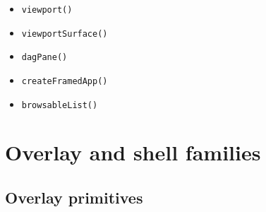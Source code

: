 \begin{itemize}
  \begin{itemize}
  \tightlist
  \item
    \texttt{v\allowbreak{}i\allowbreak{}e\allowbreak{}w\allowbreak{}p\allowbreak{}o\allowbreak{}r\allowbreak{}t\allowbreak{}(\allowbreak{})}
  \item
    \texttt{v\allowbreak{}i\allowbreak{}e\allowbreak{}w\allowbreak{}p\allowbreak{}o\allowbreak{}r\allowbreak{}t\allowbreak{}S\allowbreak{}u\allowbreak{}r\allowbreak{}f\allowbreak{}a\allowbreak{}c\allowbreak{}e\allowbreak{}(\allowbreak{})}
  \item
    \texttt{d\allowbreak{}a\allowbreak{}g\allowbreak{}P\allowbreak{}a\allowbreak{}n\allowbreak{}e\allowbreak{}(\allowbreak{})}
  \item
    \texttt{c\allowbreak{}r\allowbreak{}e\allowbreak{}a\allowbreak{}t\allowbreak{}e\allowbreak{}F\allowbreak{}r\allowbreak{}a\allowbreak{}m\allowbreak{}e\allowbreak{}d\allowbreak{}A\allowbreak{}p\allowbreak{}p\allowbreak{}(\allowbreak{})}
  \item
    \texttt{b\allowbreak{}r\allowbreak{}o\allowbreak{}w\allowbreak{}s\allowbreak{}a\allowbreak{}b\allowbreak{}l\allowbreak{}e\allowbreak{}L\allowbreak{}i\allowbreak{}s\allowbreak{}t\allowbreak{}(\allowbreak{})}
  \end{itemize}
\end{itemize}

\section{Overlay and shell families}\label{record-019-overlay-and-shell-families}

\subsection{Overlay primitives}\label{record-019-overlay-primitives}

